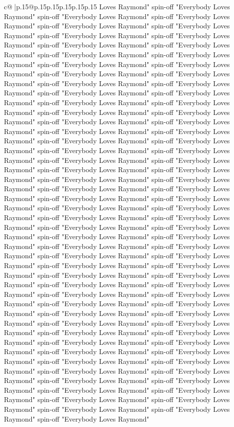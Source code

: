 \documentclass{article}
\begin{document}
{\begin{supertabular}{c@{$\;$}|p{.15\linewidth}@{}p{.15\linewidth}p{.15\linewidth}p{.15\linewidth}p{.15\linewidth}p{.15\linewidth}}
{{{Loves Raymond" spin{-}off "Everybody Loves Raymond" spin{-}off "Everybody Loves Raymond" spin{-}off "Everybody Loves Raymond" spin{-}off "Everybody Loves Raymond" spin{-}off "Everybody Loves Raymond" spin{-}off "Everybody Loves Raymond" spin{-}off "Everybody Loves Raymond" spin{-}off "Everybody Loves Raymond" spin{-}off "Everybody Loves Raymond" spin{-}off "Everybody Loves Raymond" spin{-}off "Everybody Loves Raymond" spin{-}off "Everybody Loves Raymond" spin{-}off "Everybody Loves Raymond" spin{-}off "Everybody Loves Raymond" spin{-}off "Everybody Loves Raymond" spin{-}off "Everybody Loves Raymond" spin{-}off "Everybody Loves Raymond" spin{-}off "Everybody Loves Raymond" spin{-}off "Everybody Loves Raymond" spin{-}off "Everybody Loves Raymond" spin{-}off "Everybody Loves Raymond" spin{-}off "Everybody Loves Raymond" spin{-}off "Everybody Loves Raymond" spin{-}off "Everybody Loves Raymond" spin{-}off "Everybody Loves Raymond" spin{-}off "Everybody Loves Raymond" spin{-}off "Everybody Loves Raymond" spin{-}off "Everybody Loves Raymond" spin{-}off "Everybody Loves Raymond" spin{-}off "Everybody Loves Raymond" spin{-}off "Everybody Loves Raymond" spin{-}off "Everybody Loves Raymond" spin{-}off "Everybody Loves Raymond" spin{-}off "Everybody Loves Raymond" spin{-}off "Everybody Loves Raymond" spin{-}off "Everybody Loves Raymond" spin{-}off "Everybody Loves Raymond" spin{-}off "Everybody Loves Raymond" spin{-}off "Everybody Loves Raymond" spin{-}off "Everybody Loves Raymond" spin{-}off "Everybody Loves Raymond" spin{-}off "Everybody Loves Raymond" spin{-}off "Everybody Loves Raymond" spin{-}off "Everybody Loves Raymond" spin{-}off "Everybody Loves Raymond" spin{-}off "Everybody Loves Raymond" spin{-}off "Everybody Loves Raymond" spin{-}off "Everybody Loves Raymond" spin{-}off "Everybody Loves Raymond" spin{-}off "Everybody Loves Raymond" spin{-}off "Everybody Loves Raymond" spin{-}off "Everybody Loves Raymond" spin{-}off "Everybody Loves Raymond" spin{-}off "Everybody Loves Raymond" spin{-}off "Everybody Loves Raymond" spin{-}off "Everybody Loves Raymond" spin{-}off "Everybody Loves Raymond" spin{-}off "Everybody Loves Raymond" spin{-}off "Everybody Loves Raymond" spin{-}off "Everybody Loves Raymond" spin{-}off "Everybody Loves Raymond" spin{-}off "Everybody Loves Raymond" spin{-}off "Everybody Loves Raymond" spin{-}off "Everybody Loves Raymond" spin{-}off "Everybody Loves Raymond" spin{-}off "Everybody Loves Raymond" spin{-}off "Everybody Loves Raymond" spin{-}off "Everybody Loves Raymond" spin{-}off "Everybody Loves Raymond" spin{-}off "Everybody Loves Raymond" spin{-}off "Everybody Loves Raymond" spin{-}off "Everybody Loves Raymond" spin{-}off "Everybody Loves Raymond" spin{-}off "Everybody Loves Raymond" spin{-}off "Everybody Loves Raymond" spin{-}off "Everybody Loves Raymond" spin{-}off "Everybody Loves Raymond" spin{-}off "Everybody Loves Raymond" spin{-}off "Everybody Loves Raymond" spin{-}off "Everybody Loves Raymond" spin{-}off "Everybody Loves Raymond" spin{-}off "Everybody Loves Raymond" spin{-}off "Everybody Loves Raymond" spin{-}off "Everybody Loves Raymond" spin{-}off "Everybody Loves Raymond" spin{-}off "Everybody Loves Raymond" }}}
\end{supertabular}}
\end{document}
